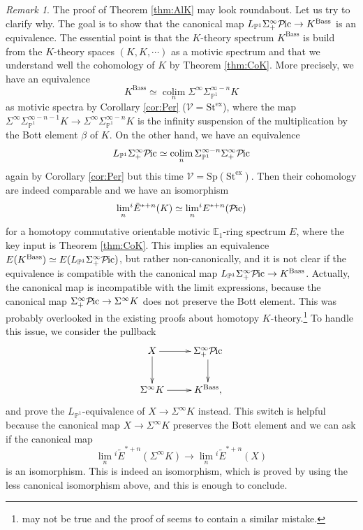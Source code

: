 \documentclass{amsart}
\theoremstyle{plain}
\theoremstyle{definition}
\theoremstyle{remark}
\newtheorem{remark}[theorem]{Remark}
\numberwithin{equation}{theorem}
\newcommand{\mbb}[1]{\mathbb{#1}}
\newcommand{\Bass}{\mathrm{Bass}}
\newcommand{\Sp}{\mathrm{Sp}}
\newcommand{\St}{\mathrm{St}}
\newcommand{\V}{\mathcal{V}}
\newcommand{\ex}{\mathrm{ex}}
\newcommand{\SigmaP}{\Sigma_{\mathbb{P}^1}}
\newcommand{\Pic}{{\mathcal{P}\mspace{-2.0mu}\mathrm{ic}}}
\newcommand{\colim}{\operatorname*{colim}}
\begin{document}
\begin{remark}
The proof of Theorem \ref{thm:AlK} may look roundabout.
Let us try to clarify why.
The goal is to show that the canonical map $L_{\mbb{P}^1}\Sigma^\infty_+\Pic\to K^\Bass$ is an equivalence.
The essential point is that the $K$-theory spectrum $K^\Bass$ is build from the $K$-theory spaces $(K,K,\cdots)$ as a motivic spectrum and that we understand well the cohomology of $K$ by Theorem \ref{thm:CoK}.
More precisely, we have an equivalence
\[
	K^\Bass \simeq \colim_n \Sigma^\infty\SigmaP^{\infty-n} K
\]
as motivic spectra by Corollary \ref{cor:Per} ($\V=\St^\ex$), where the map $\Sigma^\infty\SigmaP^{\infty-n-1}K\to\Sigma^\infty\SigmaP^{\infty-n}K$ is the infinity suspension of the multiplication by the Bott element $\beta$ of $K$.
On the other hand, we have an equivalence
\[
	L_{\mbb{P}^1}\Sigma^\infty_+\Pic \simeq \colim_n \SigmaP^{\infty-n}\Sigma^\infty_+\Pic
\]
again by Corollary \ref{cor:Per} but this time $\V=\Sp(\St^\ex)$.
Then their cohomology are indeed comparable and we have an isomorphism
\[
	\lim_n\!{}^i\tilde{E}^{*+n}(K) \simeq \lim_n\!{}^iE^{*+n}(\Pic)
\]
for a homotopy commutative orientable motivic $\mbb{E}_1$-ring spectrum $E$, where the key input is Theorem \ref{thm:CoK}.
This implies an equivalence $E(K^\Bass)\simeq E(L_{\mbb{P}^1}\Sigma^\infty_+\Pic)$, but rather non-canonically, and it is not clear if the equivalence is compatible with the canonical map $L_{\mbb{P}^1}\Sigma^\infty_+\Pic\to K^\Bass$.
Actually, the canonical map is incompatible with the limit expressions, because the canonical map $\Sigma^\infty_+\Pic\to\Sigma^\infty K$ does not preserve the Bott element.
This was probably overlooked in the existing proofs about homotopy $K$-theory.\footnote{\cite[Corollary 4.8]{GS} may not be true and the proof of \cite[Theorem 1.1]{SO} seems to contain a similar mistake.}
To handle this issue, we consider the pullback
\[
\xymatrix{
	X \ar[r] \ar[d] & \Sigma^\infty_+\Pic \ar[d] \\
	\Sigma^\infty K \ar[r] & K^\Bass,
}
\]
and prove the $L_{\mbb{P}^1}$-equivalence of $X\to\Sigma^\infty K$ instead.
This switch is helpful because the canonical map $X\to\Sigma^\infty K$ preserves the Bott element and we can ask if the canonical map
\[
	\lim_n\!{}^i\tilde{E}^{*+n}(\Sigma^\infty K) \to \lim_n\!{}^i\tilde{E}^{*+n}(X)
\]
is an isomorphism.
This is indeed an isomorphism, which is proved by using the less canonical isomorphism above, and this is enough to conclude.
\end{remark}
\end{document}
